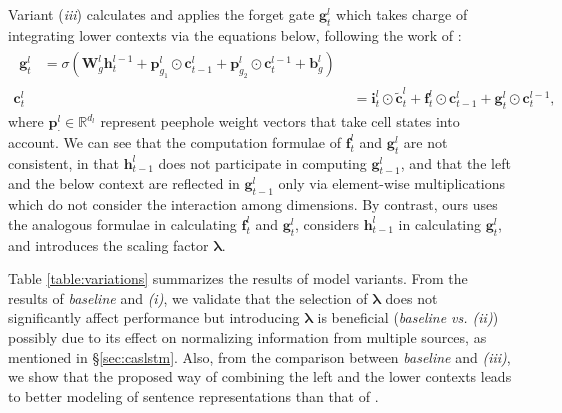 \documentclass[wcp]{jmlr}
\begin{document}
    Variant (\textit{iii}) calculates and applies the forget gate $\mathbf{g}_t^l$ which takes charge of integrating lower contexts via the equations below, following the work of \citet{zhang2016highway}:
    \begin{align}
    \begin{split}
    \mathbf{g}_t^l &= \sigma(\mathbf{W}_g^l \mathbf{h}_t^{l-1}
    + \mathbf{p}_{g_1}^l \odot \mathbf{c}_{t-1}^l + \mathbf{p}_{g_2}^l \odot \mathbf{c}_{t}^{l-1} + \mathbf{b}_g^l) \label{eq:peephole1}
    \end{split} \\
    \mathbf{c}_t^l &= \mathbf{i}_t^l \odot \tilde{\mathbf{c}}_t^l + \mathbf{f}_t^l \odot \mathbf{c}_{t-1}^l + \mathbf{g}_t^l \odot \mathbf{c}_t^{l-1}, \label{eq:peephole2}
    \end{align}
    where $\mathbf{p}_\cdot^l \in \mathbb{R}^{d_l}$ represent peephole weight vectors that take cell states into account.
    We can see that the computation formulae of $\mathbf{f}_t^l$ and $\mathbf{g}_t^l$ are not consistent, in that $\mathbf{h}_{t-1}^l$ does not participate in computing $\mathbf{g}_{t-1}^l$, and that the left and the below context are reflected in $\mathbf{g}_{t-1}^l$ only via element-wise multiplications which do not consider the interaction among dimensions.
    By contrast, ours uses the analogous formulae in calculating $\mathbf{f}_t^l$ and $\mathbf{g}_t^l$, considers $\mathbf{h}_{t-1}^{l}$ in calculating $\mathbf{g}_t^l$, and introduces the scaling factor $\bm{\lambda}$.
    
    Table \ref{table:variations} summarizes the results of model variants.
    From the results of \textit{baseline} and \textit{(i)}, we validate that the selection of $\bm\lambda$ does not significantly affect performance but introducing $\bm\lambda$ is beneficial (\textit{baseline vs. (ii)}) possibly due to its effect on normalizing information from multiple sources, as mentioned in \S\ref{sec:caslstm}.
    Also, from the comparison between  \textit{baseline} and \textit{(iii)}, we show that the proposed way of combining the left and the lower contexts leads to better modeling of sentence representations than that of \citet{zhang2016highway}.
    
\end{document}
